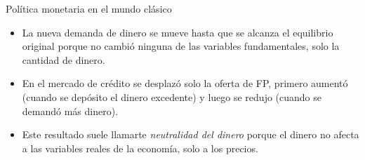 \documentclass{beamer}
\begin{document}
\begin{frame}{Política monetaria en el mundo clásico}
    \begin{itemize}
        \item La nueva demanda de dinero se mueve hasta que se alcanza el equilibrio original porque no cambió ninguna de las variables fundamentales, solo la cantidad de dinero.
        \item En el mercado de crédito se desplazó solo la oferta de FP, primero aumentó (cuando se depósito el dinero excedente) y luego se redujo (cuando se demandó más dinero).
        \item Este resultado suele llamarte \textit{neutralidad del dinero} porque el dinero no afecta a las variables reales de la economía, solo a los precios.
    \end{itemize}
\end{frame}
\end{document}

